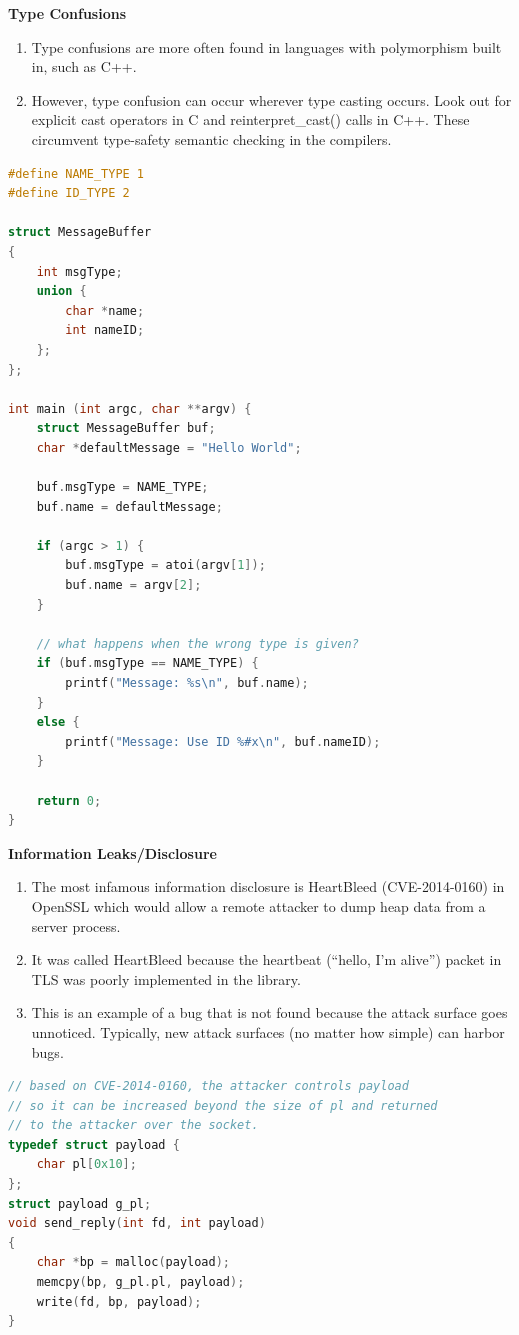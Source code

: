 \documentclass[12pt]{Training}
\begin{document}
\textbf{Type Confusions}
\begin{enumerate}
    \item Type confusions are more often found in languages with polymorphism built in, such as C++.
    \item However, type confusion can occur wherever type casting occurs. Look out for explicit cast operators in C and reinterpret\_cast() calls in C++. These circumvent type-safety semantic checking in the compilers.
\end{enumerate}
\begin{sectionbox}
\begin{lstlisting}[language=C, caption={Type Confusion}]
#define NAME_TYPE 1
#define ID_TYPE 2

struct MessageBuffer
{
    int msgType;
    union {
        char *name;
        int nameID;
    };
};

int main (int argc, char **argv) {
    struct MessageBuffer buf;
    char *defaultMessage = "Hello World";

    buf.msgType = NAME_TYPE;
    buf.name = defaultMessage;

    if (argc > 1) {
        buf.msgType = atoi(argv[1]);
        buf.name = argv[2];
    }

    // what happens when the wrong type is given?
    if (buf.msgType == NAME_TYPE) {
        printf("Message: %s\n", buf.name);
    }
    else {
        printf("Message: Use ID %#x\n", buf.nameID);
    }

    return 0;
}
\end{lstlisting}
\end{sectionbox}

\textbf{Information Leaks/Disclosure}
\begin{enumerate}
    \item The most infamous information disclosure is HeartBleed (CVE-2014-0160) in OpenSSL which would allow a remote attacker to dump heap data from a server process.
    \item It was called HeartBleed because the heartbeat (``hello, I'm alive'') packet in TLS was poorly implemented in the library.
    \item This is an example of a bug that is not found because the attack surface goes unnoticed. Typically, new attack surfaces (no matter how simple) can harbor bugs.
\end{enumerate}
\begin{sectionbox}
\begin{lstlisting}[language=C, caption={Info Leak}]
// based on CVE-2014-0160, the attacker controls payload
// so it can be increased beyond the size of pl and returned
// to the attacker over the socket.
typedef struct payload {
    char pl[0x10];
};
struct payload g_pl;
void send_reply(int fd, int payload)
{
    char *bp = malloc(payload);
    memcpy(bp, g_pl.pl, payload);
    write(fd, bp, payload);
}
\end{lstlisting}
\end{sectionbox}
\end{document}
